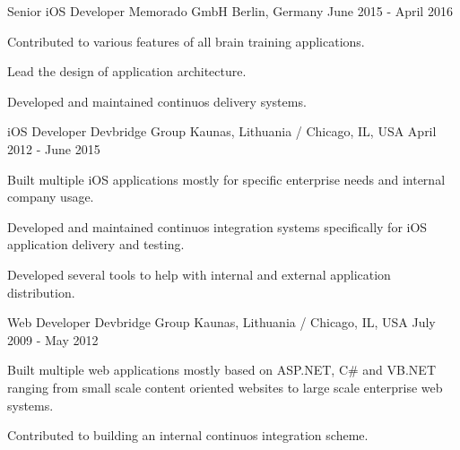 \begin{cventries}
  \cventry
    {Senior iOS Developer} %
    {Memorado GmbH} %
    {Berlin, Germany} %
    {June 2015 - April 2016} %
    {
      \begin{cvitems} %
        \item {Contributed to various features of all brain training applications.}
        \item {Lead the design of application architecture.}
        \item {Developed and maintained continuos delivery systems.}
      \end{cvitems}
    }

  \cventry
    {iOS Developer} %
    {Devbridge Group} %
    {Kaunas, Lithuania / Chicago, IL, USA} %
    {April 2012 - June 2015} %
    {
      \begin{cvitems} %
        \item {Built multiple iOS applications mostly for specific enterprise needs and internal company usage.}
        \item {Developed and maintained continuos integration systems specifically for iOS application delivery and testing.}
        \item {Developed several tools to help with internal and external application distribution.}
      \end{cvitems}
    }

  \cventry
    {Web Developer} %
    {Devbridge Group} %
    {Kaunas, Lithuania / Chicago, IL, USA} %
    {July 2009 - May 2012} %
    {
      \begin{cvitems} %
        \item {Built multiple web applications mostly based on ASP.NET, C\# and VB.NET ranging from small scale content oriented websites to large scale enterprise web systems.}
        \item {Contributed to building an internal continuos integration scheme.}
      \end{cvitems}
    }

\end{cventries}
